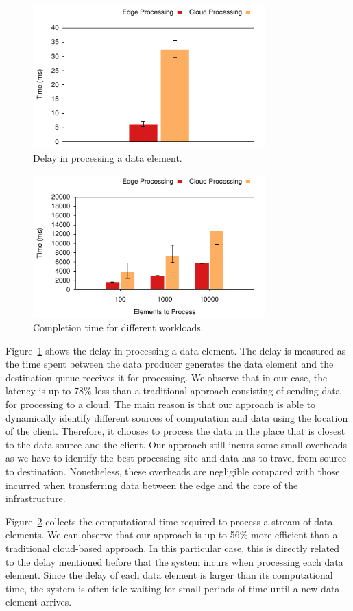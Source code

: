 \begin{figure}[h!]
  \centering
    \includegraphics[width=0.8\textwidth]{Figures/Latency.pdf}
  \caption{Delay in processing a data element.} \label{fig:perf2}
\end{figure}
\begin{figure}[htb!]
  \centering
  	\includegraphics[width=0.8\textwidth]{Figures/EdgeVsCloud.pdf}
  \caption{Completion time for different workloads.} \label{fig:perf1}
\end{figure}

Figure~\ref{fig:perf2} shows the delay in processing a data element. The delay is measured as the time spent between the data producer generates the data element and the destination queue receives it for processing. We observe that in our case, the latency is up to 78\% less than a traditional approach consisting of sending data for processing to a cloud. The main reason is that our approach is able to dynamically identify different sources of computation and data using the location of the client. Therefore, it chooses to process the data in the place that is closest to the data source and the client. Our approach still incurs some small overheads as we have to identify the best processing site and data has to travel from source to destination. Nonetheless, these overheads are negligible compared with those incurred when transferring data between the edge and the core of the infrastructure.

Figure~\ref{fig:perf1} collects the computational time required to process a stream of data elements. We can observe that our approach is up to 56\% more efficient than a traditional cloud-based approach. In this particular case, this is directly related to the delay mentioned before that the system incurs when processing each data element. Since the delay of each data element is larger than its computational time, the system is often idle waiting for small periods of time until a new data element arrives.